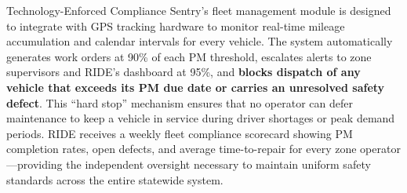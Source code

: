 \vspace{0.3cm}

\begin{sidebar}{Technology-Enforced Compliance}
Sentry's fleet management module is designed to integrate with GPS tracking hardware to monitor real-time mileage accumulation and calendar intervals for every vehicle. The system automatically generates work orders at 90\% of each PM threshold, escalates alerts to zone supervisors and RIDE's dashboard at 95\%, and \textbf{blocks dispatch of any vehicle that exceeds its PM due date or carries an unresolved safety defect}. This ``hard stop'' mechanism ensures that no operator can defer maintenance to keep a vehicle in service during driver shortages or peak demand periods. RIDE receives a weekly fleet compliance scorecard showing PM completion rates, open defects, and average time-to-repair for every zone operator---providing the independent oversight necessary to maintain uniform safety standards across the entire statewide system.
\end{sidebar}
